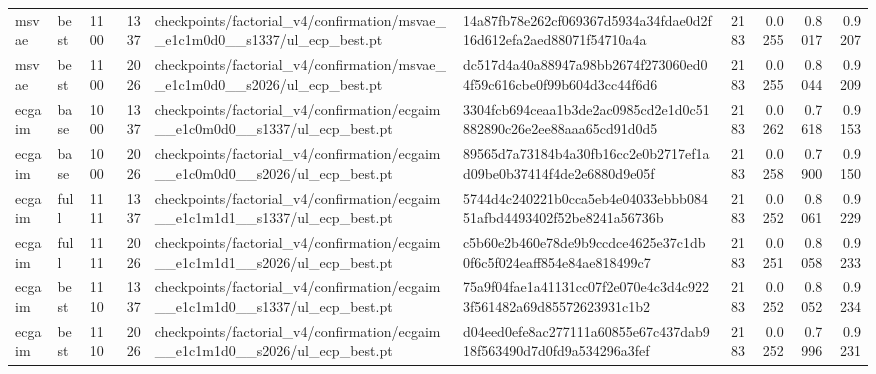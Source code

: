 \begin{tabular}{lllrllrrrr}
msvae & best & 1100 & 1337 & checkpoints/factorial_v4/confirmation/msvae__e1c1m0d0__s1337/ul_ecp_best.pt & 14a87fb78e262cf069367d5934a34fdae0d2f16d612efa2aed88071f54710a4a & 2183 & 0.0255 & 0.8017 & 0.9207 \\
msvae & best & 1100 & 2026 & checkpoints/factorial_v4/confirmation/msvae__e1c1m0d0__s2026/ul_ecp_best.pt & dc517d4a40a88947a98bb2674f273060ed04f59c616cbe0f99b604d3cc44f6d6 & 2183 & 0.0255 & 0.8044 & 0.9209 \\
ecgaim & base & 1000 & 1337 & checkpoints/factorial_v4/confirmation/ecgaim__e1c0m0d0__s1337/ul_ecp_best.pt & 3304fcb694ceaa1b3de2ac0985cd2e1d0c51882890c26e2ee88aaa65cd91d0d5 & 2183 & 0.0262 & 0.7618 & 0.9153 \\
ecgaim & base & 1000 & 2026 & checkpoints/factorial_v4/confirmation/ecgaim__e1c0m0d0__s2026/ul_ecp_best.pt & 89565d7a73184b4a30fb16cc2e0b2717ef1ad09be0b37414f4de2e6880d9e05f & 2183 & 0.0258 & 0.7900 & 0.9150 \\
ecgaim & full & 1111 & 1337 & checkpoints/factorial_v4/confirmation/ecgaim__e1c1m1d1__s1337/ul_ecp_best.pt & 5744d4c240221b0cca5eb4e04033ebbb08451afbd4493402f52be8241a56736b & 2183 & 0.0252 & 0.8061 & 0.9229 \\
ecgaim & full & 1111 & 2026 & checkpoints/factorial_v4/confirmation/ecgaim__e1c1m1d1__s2026/ul_ecp_best.pt & c5b60e2b460e78de9b9ccdce4625e37c1db0f6c5f024eaff854e84ae818499c7 & 2183 & 0.0251 & 0.8058 & 0.9233 \\
ecgaim & best & 1110 & 1337 & checkpoints/factorial_v4/confirmation/ecgaim__e1c1m1d0__s1337/ul_ecp_best.pt & 75a9f04fae1a41131cc07f2e070e4c3d4c9223f561482a69d85572623931c1b2 & 2183 & 0.0252 & 0.8052 & 0.9234 \\
ecgaim & best & 1110 & 2026 & checkpoints/factorial_v4/confirmation/ecgaim__e1c1m1d0__s2026/ul_ecp_best.pt & d04eed0efe8ac277111a60855e67c437dab918f563490d7d0fd9a534296a3fef & 2183 & 0.0252 & 0.7996 & 0.9231 \\
\bottomrule
\end{tabular}
